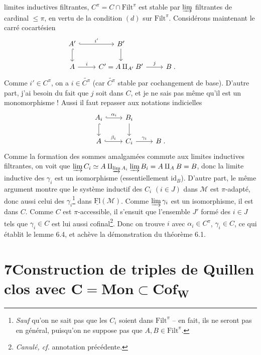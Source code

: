 \documentclass[11pt]{article}
\newcommand{\msp}[1]{\marginpar{\footnotesize [#1]}}
\newcommand{\M}{\mathcal{M}}
\newcommand{\Filt}{\mathrm{Filt}}
\newcommand{\Fl}{\mathrm{Fl}}
\begin{document}
\msp{page 83}
limites inductives filtrantes, $C^{\pi} = C \cap \Filt^{\pi}$ est stable par $\varinjlim$ filtrantes de cardinal $\leq \pi$, en vertu de la condition $(d)$ sur $\Filt^{\pi}$. Considérons maintenant le carré cocartésien
\[
\begin{tikzcd}
A' \arrow[r, hook, "i'"] \arrow[d, hook] & B' \arrow[d] & & \\
A \arrow[r, "i"] & C' = A \amalg_{A'} B' \arrow[r, "j"] & B \;.
\end{tikzcd}
\]
Comme $i' \in C^{\pi}$, on a $i \in \widetilde{C^{\pi}}$ (car $\widetilde{C^{\pi}}$ stable par cochangement de base). D'autre part, j'ai besoin du fait que $j$ soit dans $C$, et je ne sais pas même qu'il est un monomorphisme ! Aussi il faut repasser aux notations indicielles
\[
\begin{tikzcd}
A_i \arrow[r, hook, "\alpha_i"] \arrow[d, hook] & B_i \arrow[d] & \\
A \arrow[r, hook, "\beta_i"] & C_i \arrow[r, "\gamma_i"] & B \;.
\end{tikzcd}
\]
Comme la formation des sommes amalgamées commute aux limites inductives filtrantes, on voit que $\varinjlim C_i \simeq A \amalg_{\varinjlim A_i} \varinjlim B_i = A \amalg_A B = B$, donc la limite inductive des $\gamma_i$ est un isomorphisme (essentiellement $\mathrm{id}_B$). D'autre part, le même argument montre que le système inductif des $C_i$ $(i \in J)$ dans $\M$ est $\pi$-adapté, donc aussi celui des $\gamma_i$\footnote[28]{\textit{Sauf} qu'on ne sait pas que les $C_i$ soient dans $\Filt^{\pi}$ -- en fait, ils ne seront pas en général, puisqu'on ne suppose pas que $A, B \in \Filt^{\pi}$.}
\msp{page 84}
dans $\underline{\Fl}(\M)$. Comme $\varinjlim \gamma_i$ est un isomorphisme, il est dans $C$. Comme $C$ est $\pi$-accessible, il s'ensuit que l'ensemble $J'$ formé des $i \in J$ tels que $\gamma_i \in C$ est lui aussi cofinal\footnote[29]{\textit{Canulé, cf.} annotation précédente.}. Donc on trouve $i$ avec $\alpha_i \in C^{\pi}$, $\gamma_i \in C$, ce qui établit le lemme 6.4, et achève la démonstration du théorème 6.1.

\section*{7\quad Construction de triples de Quillen clos avec $\boldsymbol{C} = \mathbf{Mon} \subset \mathbf{Cof}_{\boldsymbol{W}}$}
\end{document}
